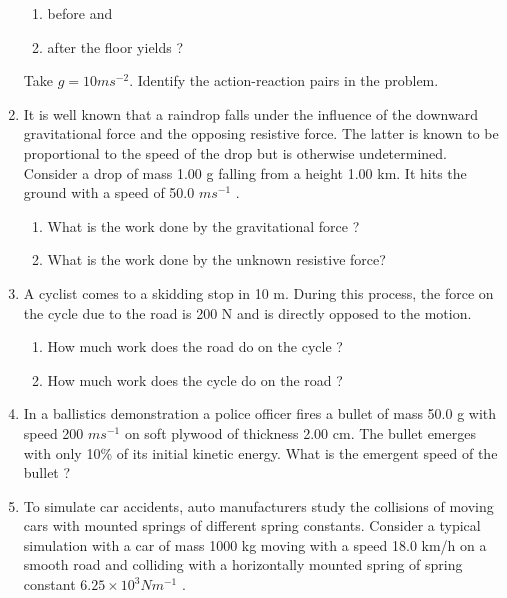 \begin{enumerate}[label=\arabic*.,ref=\thesection.\theenumi]
\begin{figure}[!ht]
\caption{}
\label{fig:5.15}
\end{figure} 
\begin{enumerate}
\item  before and 
\item  after the floor yields ? 
\end{enumerate}
Take $g = 10 m s^{-2}$. Identify the action-reaction pairs in the problem.
\item It is well known that a raindrop falls under the influence of the downward gravitational force and the opposing resistive force. The latter is known to be proportional to the speed of the drop but is otherwise undetermined. Consider a drop of mass 1.00 g falling from a height 1.00 km. It hits the ground with a speed of 50.0 $m s^{-1}$
. 
\begin{enumerate}
\item  What is the work done by the
gravitational force ? 
\item What is the work done by the unknown resistive force?
\end{enumerate}
\item  A cyclist comes to a skidding stop in 10 m. During this process, the force on the cycle due to the road is 200 N and is directly opposed to the motion. 
\begin{enumerate}
\item  How much work does the road do on the cycle ? 
\item  How much work does the cycle do on the road ?
\end{enumerate}
\item In a ballistics demonstration a police officer fires a bullet of mass 50.0 g with speed 200 $m s^{-1}$
on soft
plywood of thickness 2.00 cm. The bullet emerges with only 10\% of its initial kinetic energy. What is the emergent speed of the bullet ?
%
\item To simulate car accidents, auto manufacturers study the collisions of moving cars with mounted springs of different spring constants. Consider a typical simulation with a car of mass 1000 kg moving with a speed 18.0 km/h on a smooth road and colliding with a horizontally mounted spring of spring constant $6.25 \times 10^3 N m^{-1}$ . 


\end{enumerate}
